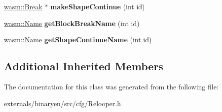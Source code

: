 \begin{DoxyCompactItemize}
\mbox{\hyperlink{classwasm_1_1_break}{wasm\+::\+Break}} $\ast$ {\bfseries make\+Shape\+Continue} (int id)
\item 
\mbox{\label{class_c_f_g_1_1_relooper_builder_a304e549e583fad69f0e6d94a8f62af45}} 
\mbox{\hyperlink{structwasm_1_1_name}{wasm\+::\+Name}} {\bfseries get\+Block\+Break\+Name} (int id)
\item 
\mbox{\label{class_c_f_g_1_1_relooper_builder_af0df38fc585a0cfc0e6cb00ce8d15cfa}} 
\mbox{\hyperlink{structwasm_1_1_name}{wasm\+::\+Name}} {\bfseries get\+Shape\+Continue\+Name} (int id)
\end{DoxyCompactItemize}
\subsection*{Additional Inherited Members}


The documentation for this class was generated from the following file\+:\begin{DoxyCompactItemize}
\item 
externals/binaryen/src/cfg/Relooper.\+h\end{DoxyCompactItemize}
